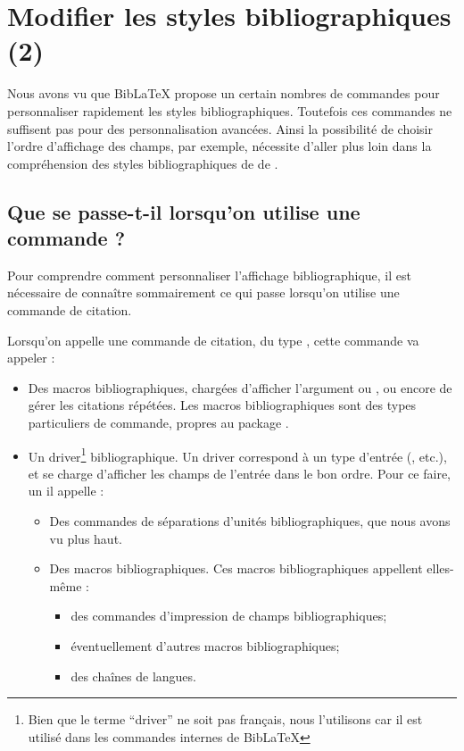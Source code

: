\chapter{Modifier les styles bibliographiques (2)}

\begin{prealable}
	Nous avons vu que BibLaTeX propose un certain nombres de commandes pour personnaliser rapidement les styles bibliographiques. Toutefois  ces commandes ne suffisent pas pour des personnalisation avancées. 
	Ainsi la possibilité de choisir l'ordre d'affichage des champs, par exemple, nécessite d'aller plus loin dans la compréhension des styles bibliographiques de de .
\end{prealable}



\section{Que se passe-t-il lorsqu'on utilise une commande  ?}

Pour comprendre comment personnaliser l'affichage bibliographique, il est nécessaire de connaître sommairement ce qui passe lorsqu'on utilise une commande de citation. 


Lorsqu'on appelle une commande de citation, du type , cette commande va appeler :
	\begin{itemize}
		\item Des macros bibliographiques, chargées d'afficher l'argument  ou , ou encore de gérer les citations répétées. Les macros bibliographiques sont des types particuliers de commande, propres au package . 
		\item Un driver\footnote{Bien que le terme \enquote{driver} ne soit pas français, nous l'utilisons car il est utilisé dans les commandes internes de BibLaTeX} bibliographique. Un driver correspond à un type d'entrée (,  etc.), et se charge d'afficher les champs de l'entrée dans le bon ordre. Pour ce faire, un il appelle :
		\begin{itemize}
			\item Des commandes de séparations d'unités bibliographiques, que nous avons vu plus haut.
			\item Des macros bibliographiques. Ces macros bibliographiques appellent elles-même :
			\begin{itemize}
				\item des commandes d'impression de champs bibliographiques;
				\item éventuellement d'autres macros bibliographiques;
				\item des chaînes de langues.
			\end{itemize}
		\end{itemize}
		
	\end{itemize}

